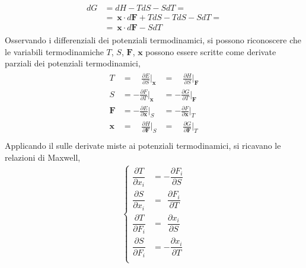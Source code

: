 \documentclass[letterpaper,10pt,english]{jupyterBook}
\begin{document}
\begin{equation*}
\begin{split}\begin{aligned}
d G & = d H - T dS - S dT = \\
    & = \ \mathbf{x} \cdot d \mathbf{F} + T dS - T dS - S dT = \\
    & = \ \mathbf{x} \cdot d \mathbf{F} - S dT 
\end{aligned}\end{split}
\end{equation*}
\sphinxAtStartPar
{} Osservando i differenziali dei potenziali termodinamici, si possono riconoscere che le variabili termodinamiche \(T\), \(S\), \(\mathbf{F}\), \(\mathbf{x}\) possono essere scritte come derivate parziali dei potenziali termodinamici,
\begin{equation*}
\begin{split}\begin{aligned}
 T & = \quad \frac{\partial E}{\partial S}\Big|_{\mathbf{x}} & = \quad \frac{\partial H}{\partial S}\Big|_{\mathbf{F}} \\
 S & =     - \frac{\partial F}{\partial T}\Big|_{\mathbf{x}} & =     - \frac{\partial G}{\partial T}\Big|_{\mathbf{F}} \\
 \mathbf{F} & =     - \frac{\partial E}{\partial \mathbf{x}}\Big|_{S} & = - \frac{\partial F}{\partial \mathbf{x}}\Big|_{T} \\
 \mathbf{x} & = \quad \frac{\partial H}{\partial \mathbf{F}}\Big|_{S} & = \quad \frac{\partial G}{\partial \mathbf{F}}\Big|_{T}\\
\end{aligned}\end{split}
\end{equation*}
\sphinxAtStartPar
{} Applicando il  sulle derivate miste ai potenziali termodinamici, si ricavano le relazioni di Maxwell,
\begin{equation*}
\begin{split}\begin{cases}
 \dfrac{\partial T}{\partial x_i} & =   - \dfrac{\partial F_i}{\partial S} \\
 \dfrac{\partial S}{\partial x_i} & = \ \ \dfrac{\partial F_i}{\partial T} \\
 \dfrac{\partial T}{\partial F_i} & = \ \ \dfrac{\partial x_i}{\partial S} \\
 \dfrac{\partial S}{\partial F_i} & =   - \dfrac{\partial x_i}{\partial T} \\
\end{cases}\end{split}
\end{equation*}
\end{document}
